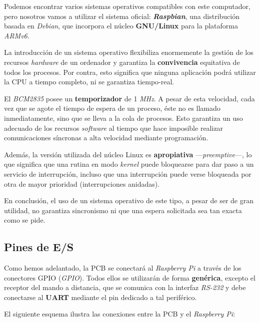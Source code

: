 Podemos encontrar varios sistemas operativos compatibles con este computador, pero nosotros vamos a utilizar el sistema oficial: \textbf{\textit{Raspbian}}, una distribución basada en \textit{Debian}, que incorpora el núcleo \textbf{GNU/Linux} para la plataforma \textit{ARMv6}.

La introducción de un sistema operativo flexibiliza enormemente la gestión de los recursos \textit{hardware} de un ordenador y garantiza la \textbf{convivencia} equitativa de todos los procesos. Por contra, esto significa que ninguna aplicación podrá utilizar la \acrshort{CPU} a tiempo completo, ni se garantiza tiempo-real.

El \textit{BCM2835} posee un \textbf{temporizador} de 1 \textit{MHz}. A pesar de esta velocidad, cada vez que se agote el tiempo de espera de un proceso, éste no es llamado inmediatamente, sino que se lleva a la cola de procesos. Esto garantiza un uso adecuado de los recursos \textit{software} al tiempo que hace imposible realizar comunicaciones síncronas a alta velocidad mediante programación.

Además, la versión utilizada del núcleo Linux es \textbf{apropiativa} ---\textit{preemptive}---, lo que significa que una rutina en modo \textit{kernel} puede bloquearse para dar paso a un servicio de interrupción, incluso que una interrupción puede verse bloqueada por otra de mayor prioridad (interrupciones anidadas).

En conclusión, el uso de un sistema operativo de este tipo, a pesar de ser de gran utilidad, no garantiza sincronismo ni que una espera solicitada sea tan exacta como se pide.

\subsection{Pines de E/S}

Como hemos adelantado, la \acrshort{PCB} se conectará al \textit{Raspberry Pi} a través de los conectores \acrshort{GPIO} (\textit{\acrlong{GPIO}}). Todos ellos se utilizarán de forma \textbf{genérica}, excepto el receptor del mando a distancia, que se comunica con la interfaz \textit{RS-232} y debe conectarse al \textbf{\acrshort{UART}} mediante el pin dedicado a tal periférico.

El siguiente esquema ilustra las conexiones entre la \acrshort{PCB} y el \textit{Raspberry Pi}:

\smallskip

